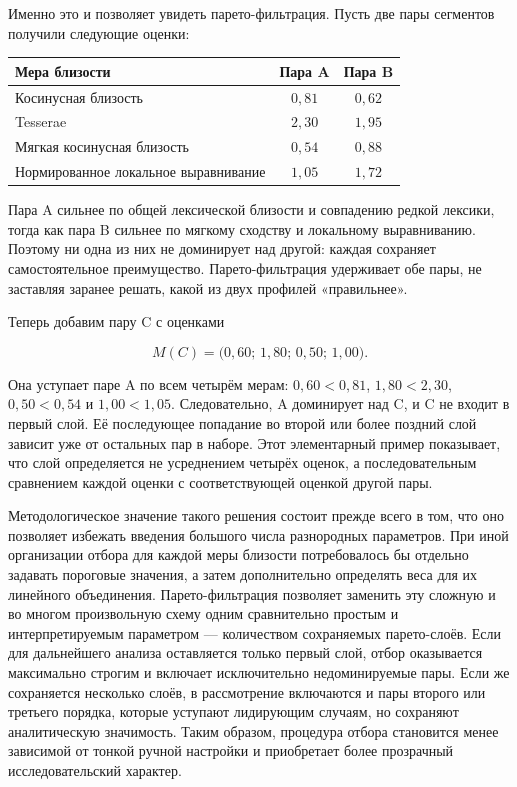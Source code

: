 Именно это и позволяет увидеть парето-фильтрация. Пусть две пары сегментов получили следующие оценки:

\begin{center}
\begin{tabular}{lcc}
\hline
\textbf{Мера близости} & \textbf{Пара A} & \textbf{Пара B} \\
\hline
Косинусная близость & $0{,}81$ & $0{,}62$ \\
Tesserae & $2{,}30$ & $1{,}95$ \\
Мягкая косинусная близость & $0{,}54$ & $0{,}88$ \\
Нормированное локальное выравнивание & $1{,}05$ & $1{,}72$ \\
\hline
\end{tabular}
\end{center}

Пара A сильнее по общей лексической близости и совпадению редкой лексики, тогда как пара B сильнее по мягкому сходству и локальному выравниванию. Поэтому ни одна из них не доминирует над другой: каждая сохраняет самостоятельное преимущество. Парето-фильтрация удерживает обе пары, не заставляя заранее решать, какой из двух профилей «правильнее».

Теперь добавим пару C с оценками

\begin{equation*}
M(C)=\bigl(0{,}60;\,1{,}80;\,0{,}50;\,1{,}00\bigr).
\end{equation*}

Она уступает паре A по всем четырём мерам: $0{,}60<0{,}81$, $1{,}80<2{,}30$, $0{,}50<0{,}54$ и $1{,}00<1{,}05$. Следовательно, A доминирует над C, и C не входит в первый слой. Её последующее попадание во второй или более поздний слой зависит уже от остальных пар в наборе. Этот элементарный пример показывает, что слой определяется не усреднением четырёх оценок, а последовательным сравнением каждой оценки с соответствующей оценкой другой пары.

Методологическое значение такого решения состоит прежде всего в том, что оно позволяет избежать введения большого числа разнородных параметров. При иной организации отбора для каждой меры близости потребовалось бы отдельно задавать пороговые значения, а затем дополнительно определять веса для их линейного объединения. Парето-фильтрация позволяет заменить эту сложную и во многом произвольную схему одним сравнительно простым и интерпретируемым параметром --- количеством сохраняемых парето-слоёв. Если для дальнейшего анализа оставляется только первый слой, отбор оказывается максимально строгим и включает исключительно недоминируемые пары. Если же сохраняется несколько слоёв, в рассмотрение включаются и пары второго или третьего порядка, которые уступают лидирующим случаям, но сохраняют аналитическую значимость. Таким образом, процедура отбора становится менее зависимой от тонкой ручной настройки и приобретает более прозрачный исследовательский характер.

